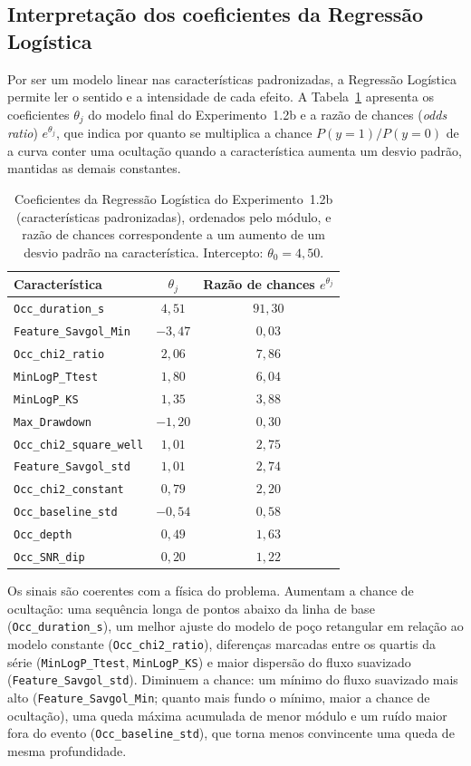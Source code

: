 \subsection{Interpretação dos coeficientes da Regressão Logística}

Por ser um modelo linear nas características padronizadas, a Regressão Logística permite ler o sentido e a intensidade de cada efeito. A Tabela~\ref{tab:coeficientes_rl} apresenta os coeficientes $\theta_j$ do modelo final do Experimento~1.2b e a razão de chances (\textit{odds ratio}) $e^{\theta_j}$, que indica por quanto se multiplica a chance $P(y=1)/P(y=0)$ de a curva conter uma ocultação quando a característica aumenta um desvio padrão, mantidas as demais constantes.

\begin{table}[htbp]
\centering
\caption{Coeficientes da Regressão Logística do Experimento~1.2b (características padronizadas), ordenados pelo módulo, e razão de chances correspondente a um aumento de um desvio padrão na característica. Intercepto: $\theta_0 = 4{,}50$.}
\label{tab:coeficientes_rl}
\footnotesize
\begin{tabular}{lcc}
\hline
\textbf{Característica} & $\theta_j$ & \textbf{Razão de chances} $e^{\theta_j}$ \\
\hline
\texttt{Occ\_duration\_s} & $4{,}51$ & $91{,}30$ \\
\texttt{Feature\_Savgol\_Min} & $-3{,}47$ & $0{,}03$ \\
\texttt{Occ\_chi2\_ratio} & $2{,}06$ & $7{,}86$ \\
\texttt{MinLogP\_Ttest} & $1{,}80$ & $6{,}04$ \\
\texttt{MinLogP\_KS} & $1{,}35$ & $3{,}88$ \\
\texttt{Max\_Drawdown} & $-1{,}20$ & $0{,}30$ \\
\texttt{Occ\_chi2\_square\_well} & $1{,}01$ & $2{,}75$ \\
\texttt{Feature\_Savgol\_std} & $1{,}01$ & $2{,}74$ \\
\texttt{Occ\_chi2\_constant} & $0{,}79$ & $2{,}20$ \\
\texttt{Occ\_baseline\_std} & $-0{,}54$ & $0{,}58$ \\
\texttt{Occ\_depth} & $0{,}49$ & $1{,}63$ \\
\texttt{Occ\_SNR\_dip} & $0{,}20$ & $1{,}22$ \\
\hline
\end{tabular}
\end{table}

Os sinais são coerentes com a física do problema. Aumentam a chance de ocultação: uma sequência longa de pontos abaixo da linha de base (\texttt{Occ\_duration\_s}), um melhor ajuste do modelo de poço retangular em relação ao modelo constante (\texttt{Occ\_chi2\_ratio}), diferenças marcadas entre os quartis da série (\texttt{MinLogP\_Ttest}, \texttt{MinLogP\_KS}) e maior dispersão do fluxo suavizado (\texttt{Feature\_Savgol\_std}). Diminuem a chance: um mínimo do fluxo suavizado mais alto (\texttt{Feature\_Savgol\_Min}; quanto mais fundo o mínimo, maior a chance de ocultação), uma queda máxima acumulada de menor módulo e um ruído maior fora do evento (\texttt{Occ\_baseline\_std}), que torna menos convincente uma queda de mesma profundidade.

